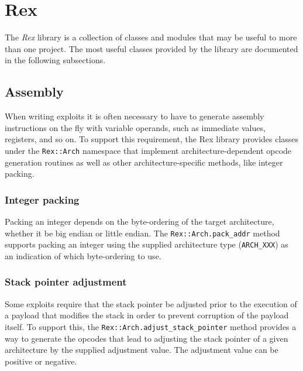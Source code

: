 \documentclass{report}
\begin{document}
\chapter{Rex}

\par
The \textit{Rex} library is a collection of classes and modules that
may be useful to more than one project.  The most useful classes
provided by the library are documented in the following subsections.

    \section{Assembly}

\par
When writing exploits it is often necessary to have to generate
assembly instructions on the fly with variable operands, such as
immediate values, registers, and so on.  To support this
requirement, the Rex library provides classes under the
\texttt{Rex::Arch} namespace that implement architecture-dependent
opcode generation routines as well as other architecture-specific
methods, like integer packing.

        \subsection{Integer packing}

\par
Packing an integer depends on the byte-ordering of the target
architecture, whether it be big endian or little endian.  The
\texttt{Rex::Arch.pack\_addr} method supports packing an integer
using the supplied architecture type (\texttt{ARCH\_XXX}) as an
indication of which byte-ordering to use.

        \subsection{Stack pointer adjustment}

\par
Some exploits require that the stack pointer be adjusted prior to
the execution of a payload that modifies the stack in order to
prevent corruption of the payload itself.  To support this, the
\texttt{Rex::Arch.adjust\_stack\_pointer} method provides a way to
generate the opcodes that lead to adjusting the stack pointer of a
given architecture by the supplied adjustment value.  The adjustment
value can be positive or negative.
\end{document}
